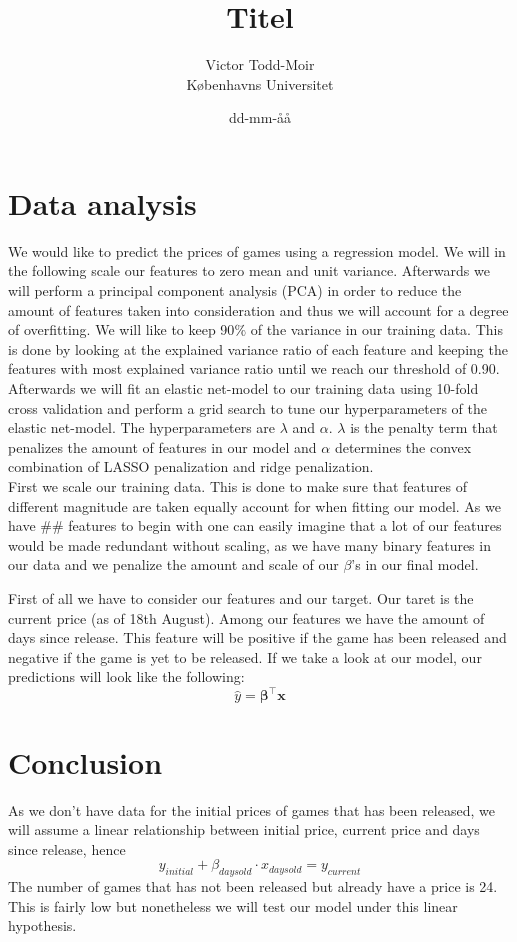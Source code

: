 \documentclass[12pt,a4paper]{article}
\author{Victor Todd-Moir\\Københavns Universitet}
\date{dd-mm-åå}
\title{Titel}
\begin{document}
	\maketitle
\section*{Data analysis}
We would like to predict the prices of games using a regression model. We will in the following scale our features to zero mean and unit variance. Afterwards we will perform a principal component analysis (PCA) in order to reduce the amount of features taken into consideration and thus we will account for a degree of overfitting. We will like to keep 90$\text{\%}$ of the variance in our training data. This is done by looking at the explained variance ratio of each feature and keeping the features with most explained variance ratio until we reach our threshold of 0.90. Afterwards we will fit an elastic net-model to our training data using 10-fold cross validation and perform a grid search to tune our hyperparameters of the elastic net-model. The hyperparameters are $\lambda$ and $\alpha$. $\lambda$ is the penalty term that penalizes the amount of features in our model and $\alpha$ determines the convex combination of LASSO penalization and ridge penalization.\\
First we scale our training data. This is done to make sure that features of different magnitude are taken equally account for when fitting our model. As we have $\#\#$ features to begin with one can easily imagine that a lot of our features would be made redundant without scaling, as we have many binary features in our data and we penalize the amount and scale of our $\beta$'s in our final model. 

First of all we have to consider our features and our target. Our taret is the current price (as of 18th August). Among our features we have the amount of days since release. This feature will be positive if the game has been released and negative if the game is yet to be released. If we take a look at our model, our predictions will look like the following:
$$\hat{y} = \boldsymbol{\beta}^\intercal\boldsymbol{x}$$


\section*{Conclusion}
As we don't have data for the initial prices of games that has been released, we will assume a linear relationship between initial price, current price and days since release, hence
$$y_{initial} + \beta_{days old}\cdot x_{days old} = y_{current}$$
The number of games that has not been released but already have a price is 24. This is fairly low but nonetheless we will test our model under this linear hypothesis. 
\end{document}
